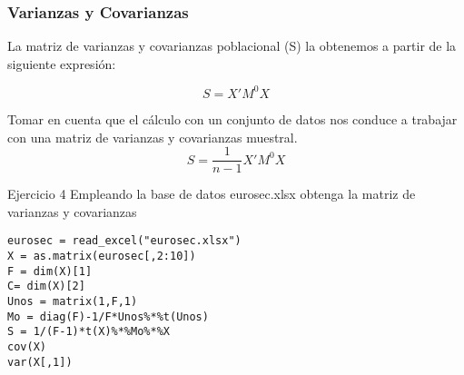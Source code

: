 \documentclass[16.5pt]{beamer}
\begin{document}
{
\begin{frame}
\frametitle{\textbf{Varianzas y Covarianzas}}
\hspace*{-5mm}
\vspace*{-2mm} 
\vspace{0.3cm}

La matriz de varianzas y covarianzas poblacional (S) la obtenemos a partir de la siguiente expresión:

\tiny
$$S = X'M^0X $$
\normalsize

Tomar en cuenta que el cálculo con un conjunto de datos nos conduce a trabajar con una matriz de varianzas y covarianzas muestral.
\tiny
$$S = \frac{1}{n-1}X'M^0X $$
\normalsize

\begin{bclogo}{Ejercicio 4}
 {\tiny\color{blue} Empleando la base de datos eurosec.xlsx obtenga la matriz de varianzas y covarianzas}
\begin{lstlisting}[basicstyle=\tiny]
eurosec = read_excel("eurosec.xlsx")
X = as.matrix(eurosec[,2:10])
F = dim(X)[1]
C= dim(X)[2]
Unos = matrix(1,F,1)
Mo = diag(F)-1/F*Unos%*%t(Unos)
S = 1/(F-1)*t(X)%*%Mo%*%X
cov(X)
var(X[,1])
\end{lstlisting}
\end{bclogo}

\end{frame}
}

\end{document}
